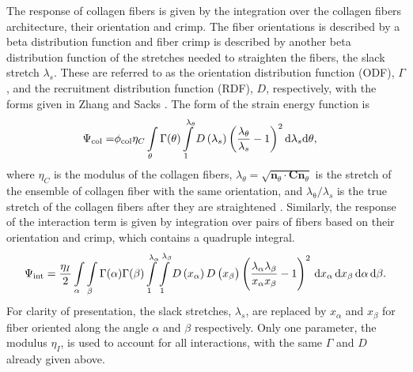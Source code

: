     The response of collagen fibers is given by the integration over the collagen fibers architecture, their orientation and crimp. The fiber orientations is described by a beta distribution function and fiber crimp is described by another beta distribution function of the stretches needed to straighten the fibers, the slack stretch $\lambda_s$. These are referred to as the orientation distribution function (ODF), $\Gamma$, and the recruitment distribution function (RDF), $D$, respectively, with the forms given in Zhang and Sacks \cite{zhang_meso_2016, zhang_modeling_2017, sacks_novel_2015}. The form of the strain energy function is 
\begin{equation} \label{eqn:collagen}
\begin{aligned}
\Psi_\mathrm{col} =& \phi_\mathrm{col} \eta_C \int\displaylimits_\theta \Gamma(\theta) 
\int\displaylimits_1^{\lambda_\theta} D\left(\lambda_s \right) \left( \frac{\lambda_\theta}{\lambda_s} - 1\right)^2 \mathrm{d}\lambda_s \mathrm{d}\theta,
\end{aligned}
\end{equation}
    where $\eta_C$ is the modulus of the collagen fibers, $\lambda_\theta = \sqrt{\mathbf{n}_\theta \cdot \mathbf{C}\mathbf{n}_\theta}$ is the stretch of the ensemble of collagen fiber with the same orientation, and $\lambda_\mathrm{\theta}/\lambda_s$ is the true stretch of the collagen fibers after they are straightened \cite{zhang_meso_2016}. Similarly, the response of the interaction term is given by integration over pairs of fibers based on their orientation and crimp, which contains a quadruple integral. 
\begin{equation}
\Psi_\mathrm{int} = \frac{\eta_I}{2} \int\displaylimits_\alpha \int\displaylimits_\beta \Gamma(\alpha) \Gamma(\beta) \int\displaylimits_1^{\lambda_\alpha} \int\displaylimits_1^{\lambda_\beta} D\left( x_\alpha \right) D\left( x_\beta \right) \left( \frac{\lambda_\alpha \lambda_\beta}{x_\alpha x_\beta} - 1\right)^2 \,\mathrm{d}x_\alpha \,\mathrm{d}x_\beta \,\mathrm{d}\alpha \,\mathrm{d}\beta.
\end{equation}
For clarity of presentation, the slack stretches, $\lambda_s$, are replaced by $x_\alpha$ and $x_\beta$ for fiber oriented along the angle $\alpha$ and $\beta$ respectively. Only one parameter, the modulus $\eta_I$, is used to account for all interactions, with the same $\Gamma$ and $D$ already given above. 

